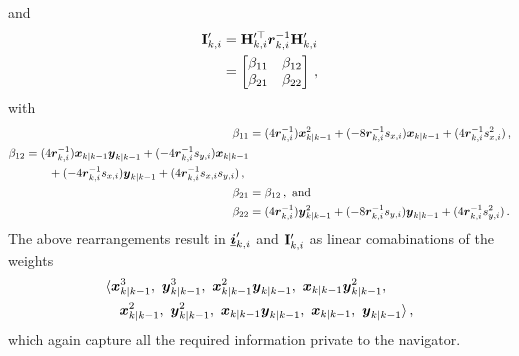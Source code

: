 \documentclass[10pt,letterpaper,oneside,twocolumn,journal]{IEEEtran}
\theoremstyle{definition}
\theoremstyle{definition}
\theoremstyle{remark}
\begin{document}
and
\begin{equation}
    \begin{split}
        \mat{I}'_{k,i} &= \mat{H}_{k,i}^{\prime\top} \rv{r}_{k,i}^{-1}\mat{H}'_{k,i} \\
        &=
        \begin{bmatrix}
            \beta_{11} & \beta_{12} \\
            \beta_{21} & \beta_{22}
        \end{bmatrix}\,,
    \end{split} \label{eqn:hrh_linear_comb}
\end{equation}
with
\begin{align*}
    \beta_{11} &= (4{\boldsymbol{r}}_{k,i}^{-1}){\boldsymbol{x}}_{k|k-1}^2 + (-8{\boldsymbol{r}}_{k,i}^{-1}s_{x,i}){\boldsymbol{x}}_{k|k-1} + (4{\boldsymbol{r}}_{k,i}^{-1}s_{x,i}^2)\,, \\
    \begin{split}
        \beta_{12} &= (4{\boldsymbol{r}}_{k,i}^{-1}){\boldsymbol{x}}_{k|k-1}{\boldsymbol{y}}_{k|k-1} + (-4{\boldsymbol{r}}_{k,i}^{-1}s_{y,i}){\boldsymbol{x}}_{k|k-1}  \\
        &\qquad+ (-4{\boldsymbol{r}}_{k,i}^{-1}s_{x,i}){\boldsymbol{y}}_{k|k-1} + (4{\boldsymbol{r}}_{k,i}^{-1}s_{x,i}s_{y,i})\,,
    \end{split}\\
    \beta_{21} &= \beta_{12}\,,\ \textrm{and} \\
    \beta_{22} &= (4{\boldsymbol{r}}_{k,i}^{-1}){\boldsymbol{y}}_{k|k-1}^2 + (-8{\boldsymbol{r}}_{k,i}^{-1}s_{y,i}){\boldsymbol{y}}_{k|k-1} + (4{\boldsymbol{r}}_{k,i}^{-1}s_{y,i}^2)\,.
\end{align*}
The above rearrangements result in ${\boldsymbol{\underline{i}}}'_{k,i}$ and ${{\mathbf{I}}}'_{k,i}$ as linear comabinations of the weights 
\begin{equation}
    \begin{split}
        &\langle \rv{x}_{k|k-1}^3,\ \rv{y}_{k|k-1}^3,\ \rv{x}_{k|k-1}^2\rv{y}_{k|k-1},\ \rv{x}_{k|k-1}\rv{y}_{k|k-1}^2,\\
        &\quad \rv{x}_{k|k-1}^2,\ \rv{y}_{k|k-1}^2,\ \rv{x}_{k|k-1}\rv{y}_{k|k-1},\ \rv{x}_{k|k-1},\ \rv{y}_{k|k-1}\rangle\,,
    \end{split} \label{eqn:weights_to_broadcast}
\end{equation}
which again capture all the required information private to the navigator.
\end{document}
